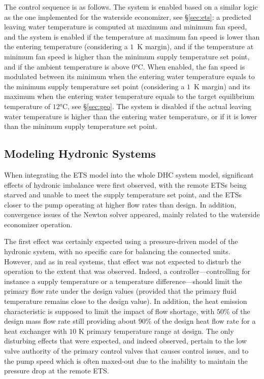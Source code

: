 The control sequence is as follows. The system is enabled based on a similar logic as the one implemented for the waterside economizer, see §\ref{sec:ets}:
a predicted leaving water temperature is computed at maximum and minimum fan speed, and  the system is enabled if the temperature at maximum fan speed is lower than the entering temperature (considering a $1$~K margin), and if the temperature at minimum fan speed is higher than the minimum supply temperature set point, and if the ambient temperature is above $0$°C.
When enabled, the fan speed is modulated between its minimum when the entering water temperature equals to the minimum supply temperature set point (considering a $1$~K margin) and its maximum when the entering water temperature equals to the target equilibrium temperature of $12$°C, see §\ref{sec:geo}.
The system is disabled if the actual leaving water temperature is higher than the entering water temperature, or if it is lower than the minimum supply temperature set point.


\subsection{Modeling Hydronic Systems} \label{sec:balancing}

When integrating the ETS model into the whole DHC system model, significant effects of hydronic imbalance were first observed, with the remote ETSs being starved and unable to meet the supply temperature set point, and the ETSs closer to the pump operating at higher flow rates than design.
In addition, convergence issues of the Newton solver appeared, mainly related to the waterside economizer operation.

The first effect was certainly expected using a pressure-driven model of the hydronic system, with no specific care for balancing the connected units. However, and as in real systems, that effect was not expected to disturb the operation to the extent that was observed. Indeed, a controller---controlling for instance a supply temperature or a temperature difference---should limit the primary flow rate under the design values (provided that the primary fluid temperature remains close to the design value). In addition, the heat emission characteristic is supposed to limit the impact of flow shortage, with $50\%$ of the design mass flow rate still providing about $90\%$ of the design heat flow rate for a heat exchanger with $10$ K primary temperature range at design. The only disturbing effects that were expected, and indeed observed, pertain to the low valve authority of the primary control valves that causes control issues, and to the pump speed which is often maxed-out due to the inability to maintain the pressure drop at the remote ETS.

